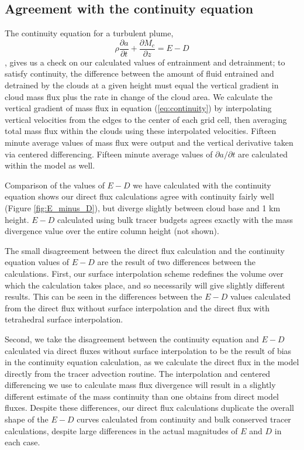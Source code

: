 \documentclass[12pt]{article}
\begin{document}

\subsection{Agreement with the continuity equation}

The continuity equation for a turbulent plume, 
\begin{equation}
    \label{eq:continuity}
    \rho \frac{\partial a}{\partial t} 
    + \frac{\partial M_c}{\partial z}
    = E - D
\end{equation},
gives us a check on our calculated values of entrainment and detrainment; to 
satisfy continuity, the difference between the amount of fluid entrained and 
detrained by the clouds at a given height must equal the vertical gradient in 
cloud mass flux plus the rate in change of the cloud area.  We calculate the 
vertical gradient of mass flux in equation (\ref{eq:continuity}) by 
interpolating vertical velocities from the edges to the center of each grid 
cell, then averaging total mass flux within the clouds using these interpolated 
velocities.  Fifteen minute average values of mass flux were output and the 
vertical derivative taken via centered differencing.  Fifteen minute average 
values of $\partial a/\partial t$ are calculated within the model as well.

Comparison of the values of $E-D$ we have calculated with the continuity 
equation shows our direct flux calculations agree with continuity fairly well
(Figure \ref{fig:E_minus_D}), but diverge slightly between cloud base and 1 km
height.  $E-D$ calculated using bulk tracer budgets agrees exactly with the
mass divergence value over the entire column height (not shown).

The small disagreement between the direct flux calculation and the continuity 
equation values of $E-D$ are the result of two differences between the 
calculations.  First, our surface interpolation scheme redefines the volume 
over which the calculation takes place, and so necessarily will give slightly 
different results.  This can be seen in the differences between the $E-D$ 
values calculated from the direct flux without surface interpolation and the 
direct flux with tetrahedral surface interpolation.

Second, we take the disagreement between the continuity equation and $E-D$
calculated via direct fluxes without surface interpolation to be the result of
bias in the continuity equation calculation, as we calculate the direct flux in
the model directly from the tracer advection routine.  The interpolation and
centered differencing we use to calculate mass flux divergence will result in a
slightly different estimate of the mass continuity than one obtains from direct
model fluxes.  Despite these differences, our direct flux calculations 
duplicate the overall shape of the $E-D$ curves calculated from continuity and 
bulk conserved tracer calculations, despite large differences in the actual
magnitudes of $E$ and $D$ in each case.
\end{document}

